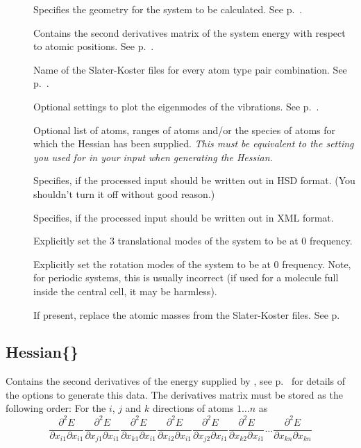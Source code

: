 \begin{description}
\item[] Specifies the geometry for the system to be
  calculated.  See p.~.
\item[] Contains the second derivatives matrix of the
  system energy with respect to atomic positions. See
  p.~.
\item[] Name of the Slater-Koster files for every atom
  type pair combination. See p.~.
\item[] Optional settings to plot the eigenmodes of the
  vibrations. See p.~.
\item[] Optional list of atoms, ranges of atoms and/or the species of
  atoms for which the Hessian has been supplied. \emph{This must be equivalent
    to the setting you used for  in your \dftbp{} input when
    generating the Hessian.}
\item[] Specifies, if the processed input should be written
  out in HSD format. (You shouldn't turn it off without good reason.)
\item[] Specifies, if the processed input should be written
  out in XML format.
\item[] Explicitly set the 3 translational modes of the
  system to be at 0 frequency.
\item[] Explicitly set the rotation modes of the system to be
  at 0 frequency. Note, for periodic systems, this is usually incorrect (if used
  for a molecule full inside the central cell, it may be harmless).
\item[] If present, replace the atomic masses from the Slater-Koster files. See
  p.~
\end{description}


\subsection{Hessian\{\}}
\label{sec:modes.Hessian}

Contains the second derivatives of the energy supplied by
{\dftbp}, see p.~ for details of the options
to generate this data. The derivatives matrix must be stored as the following
order: For the $i$, $j$ and $k$ directions of atoms $1 \ldots n$
as $$\frac{\partial^2 E}{\partial x_{i1} \partial x_{i1}} \frac{\partial^2
  E}{\partial x_{j1} \partial x_{i1}} \frac{\partial^2 E}{\partial x_{k1}
  \partial x_{i1}} \frac{\partial^2 E}{\partial x_{i2} \partial x_{i1}}
\frac{\partial^2 E}{\partial x_{j2} \partial x_{i1}} \frac{\partial^2
  E}{\partial x_{k2} \partial x_{i1}} \ldots \frac{\partial^2 E}{\partial x_{kn}
  \partial x_{kn}}$$

